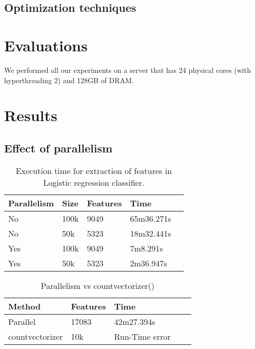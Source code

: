 \documentclass{article}
\begin{document}
\subsection{Optimization techniques}


\section{Evaluations}

We performed all our experiments on a server that has 24 physical cores (with hyperthreading 2) and 128GB of DRAM. 

\section{Results}

\subsection{Effect of parallelism}
\begin{table}[H]
\caption{Execution time for extraction of features in Logistic regression classifier.}
\label{sample-table}
\begin{center}
\begin{small}
\begin{sc}
\begin{tabular}{lllll}
\hline
Parallelism & Size & Features & Time \\
\hline
No  & 100k & 9049 & 65m36.271s \\
No  & 50k & 5323 & 18m32.441s \\
Yes  & 100k & 9049 & 7m8.291s \\
Yes  & 50k & 5323 & 2m36.947s \\
\hline
\end{tabular}
\end{sc}
\end{small}
\end{center}
\end{table}




\begin{table}[H]
\caption{Parallelism vs countvectorizer()}
\label{sample-table}
\begin{center}
\begin{small}
\begin{sc}
\begin{tabular}{lllll}
\hline
Method & Features & Time \\
\hline
Parallel  & 17083 & 42m27.394s \\
countvectorizer  & 10k & Run-Time error \\
\hline
\end{tabular}
\end{sc}
\end{small}
\end{center}
\end{table}
\end{document}
